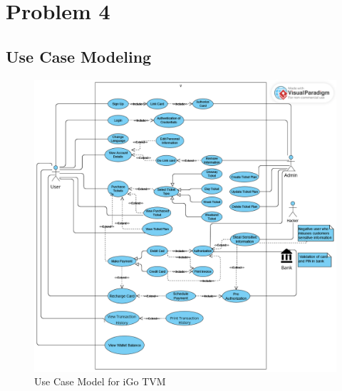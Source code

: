 \documentclass[a4paper, 11pt]{report}
\begin{document}
\chapter{Problem 4}
\section{Use Case Modeling}
\begin{figure}[h]
    \centering
    \includegraphics[scale=0.35]{Use_Case_Diagram.png}
    \caption{Use Case Model for iGo TVM}
    \label{fig:Use_Case_Diagram}
\end{figure}
\\\\
\end{document}
